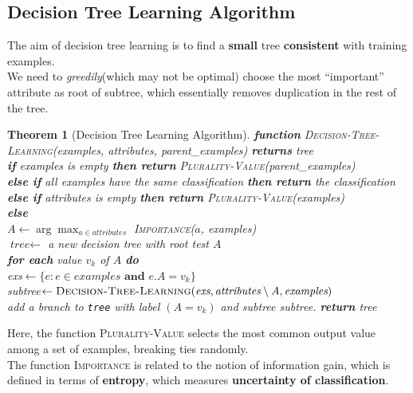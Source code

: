 \documentclass[12pt]{article}
\newcommand{\ind}{\hspace*{15pt}}
\newtheorem{theorem}{Theorem}[section]
\theoremstyle{definition}
\begin{document}
\subsection{Decision Tree Learning Algorithm}
The aim of decision tree learning is to find a \textbf{small} tree \textbf{consistent} with training examples.\\
We need to \textit{greedily}(which may not be optimal) choose the most ``important'' attribute as root of subtree, which essentially removes duplication in the rest of the tree.\\
\begin{theorem}[Decision Tree Learning Algorithm]
\normalfont
\textbf{function} \textsc{Decision-Tree-Learning}(\textit{examples, attributes, parent\_examples}) \textbf{returns} tree\\
\ind \textbf{if} \textit{examples} is empty \textbf{then return} \textsc{Plurality-Value}(\textit{parent\_examples})\\
\ind \textbf{else if} all \textit{examples} have the same classification \textbf{then return} the classification\\
\ind \textbf{else if} \textit{attributes} is empty \textbf{then return} \textsc{Plurality-Value}(\textit{examples})\\
\ind \textbf{else}\\
\ind\ind $A\leftarrow \arg\max_{a\in \textit{attributes}}$ \textsc{Importance}($a$, \textit{examples})\\
\ind\ind $\textit{tree}\leftarrow$ a new decision tree with root test $A$\\
\ind\ind \textbf{for each} value $v_k$ of $A$ \textbf{do}\\
\ind\ind\ind \textit{exs}$\leftarrow\{e: e\in \textit{examples} \textbf{ and }e.A=v_k \}$\\
\ind\ind\ind \textit{subtree}$\leftarrow\textsc{Decision-Tree-Learning}(\textit{exs}, \textit{attributes}\setminus A, \textit{examples})$\\
\ind\ind\ind add a branch to \texttt{tree} with label $(A=v_k)$ and subtree \textit{subtree}.
\ind\ind \textbf{return} \textit{tree}\\
\end{theorem}
Here, the function \textsc{Plurality-Value} selects the most common output value among a set of examples, breaking ties randomly.\\
The function \textsc{Importance} is related to the notion of information gain, which is defined in terms of \textbf{entropy}, which measures \textbf{uncertainty of classification}.
\end{document}
